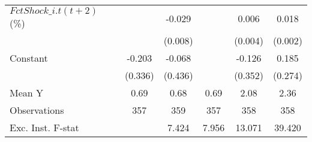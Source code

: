 {\begin{tabular}{l*{5}{c}}
\addlinespace
$ FctShock\_{i.t}(t+2)$ (\%)&                     &      -0.029\sym{***}&                     &       0.006         &       0.018\sym{***}\\
                    &                     &     (0.008)         &                     &     (0.004)         &     (0.002)         \\
\addlinespace
Constant            &      -0.203         &      -0.068         &                     &      -0.126         &       0.185         \\
                    &     (0.336)         &     (0.436)         &                     &     (0.352)         &     (0.274)         \\
\midrule
Mean Y              &        0.69         &        0.68         &        0.69         &        2.08         &        2.36         \\
Observations        &         357         &         359         &         357         &         358         &         358         \\
Exc. Inst. F-stat   &                     &       7.424         &       7.956         &      13.071         &      39.420         \\
\bottomrule
\end{tabular}
}
